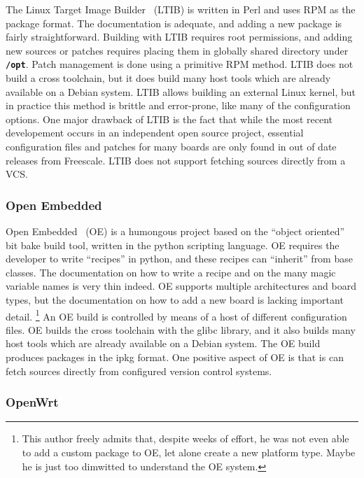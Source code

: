 \documentclass[a4paper,10pt]{article}
\newcommand{\fw}{\tt\bf}
\begin{document}
    The Linux Target Image Builder~\cite{ltib} (LTIB) is written in
    Perl and uses RPM as the package format. The documentation is
    adequate, and adding a new package is fairly straightforward.
    Building with LTIB requires root permissions, and adding new
    sources or patches requires placing them in globally shared
    directory under {\fw /opt}.
%
    Patch management is done using a primitive RPM method. LTIB does
    not build a cross toolchain, but it does build many host tools
    which are already available on a Debian system.
%
    LTIB allows building an external Linux kernel, but in practice
    this method is brittle and error-prone, like many of the
    configuration options. One major drawback of LTIB is the fact that
    while the most recent developement occurs in an independent open
    source project, essential configuration files and patches for many
    boards are only found in out of date releases from Freescale.
    LTIB does not support fetching sources directly from a VCS.

\subsubsection{Open Embedded}

    Open Embedded~\cite{oe} (OE) is a humongous project based on the
    ``object oriented'' bit bake build tool, written in the python
    scripting language. OE requires the developer to write ``recipes''
    in python, and these recipes can ``inherit'' from base classes.
    The documentation on how to write a recipe and on the many magic
    variable names is very thin indeed. OE supports multiple
    architectures and board types, but the documentation on how to add
    a new board is lacking important detail.%
    \footnote {
      This author freely admits that, despite weeks of effort, he was
      not even able to add a custom package to OE, let alone create a
      new platform type. Maybe he is just too dimwitted to understand
      the OE system.
    }
    An OE build is controlled by means of a host of different
    configuration files.  OE builds the cross toolchain with the glibc
    library, and it also builds many host tools which are already
    available on a Debian system. The OE build produces packages in
    the ipkg format.  One positive aspect of OE is that is can fetch
    sources directly from configured version control systems.

\subsubsection{OpenWrt}
\end{document}
